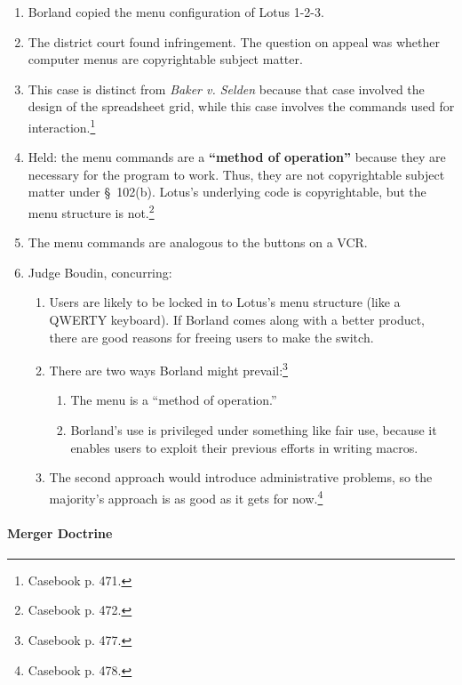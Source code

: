 \begin{enumerate}
    \item Borland copied the menu configuration of Lotus 1-2-3.
    \item The district court found infringement. The question on appeal was 
    whether computer menus are copyrightable subject matter.
    \item This case is distinct from \emph{Baker v. Selden} because that case 
    involved the design of the spreadsheet grid, while this case involves the 
    commands used for interaction.\footnote{Casebook p. 471.}
    \item Held: the menu commands are a \textbf{``method of operation''} 
    because they are necessary for the program to work. Thus, they are not 
    copyrightable subject matter under \S\ 102(b). Lotus's underlying code is 
    copyrightable, but the menu structure is not.\footnote{Casebook p. 472.}
    \item The menu commands are analogous to the buttons on a VCR.
    \item Judge Boudin, concurring:
    \begin{enumerate}
        \item Users are likely to be locked in to Lotus's menu structure (like 
        a QWERTY keyboard). If Borland comes along with a better product, 
        there are good reasons for freeing users to make the switch.
        \item There are two ways Borland might prevail:\footnote{Casebook p. 
        477.}
        \begin{enumerate}
            \item The menu is a ``method of operation.''
            \item Borland's use is privileged under something like fair use, 
            because it enables users to exploit their previous efforts in 
            writing macros.
        \end{enumerate}
        \item The second approach would introduce administrative problems, so 
        the majority's approach is as good as it gets for 
        now.\footnote{Casebook p. 478.}
    \end{enumerate}
\end{enumerate}

\paragraph{Merger Doctrine}

